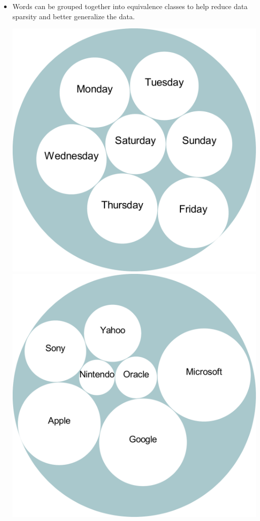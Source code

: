 \documentclass[xcolor=pdftex,x11names,table,hyperref]{beamer}
\begin{document}
\begin{frame}{}
\begin{itemize}
	\item Words can be grouped together into equivalence classes to help reduce data sparsity and better generalize the data.

\begin{center}
	\pause
	\includegraphics[width=0.45\textheight]{images/clusters_days.pdf}
	\hspace*{1.3em}%
	\includegraphics[width=0.45\textheight]{images/clusters_tech_companies.pdf}%
\end{center}
\pause


\end{itemize}
\end{frame}
\end{document}

